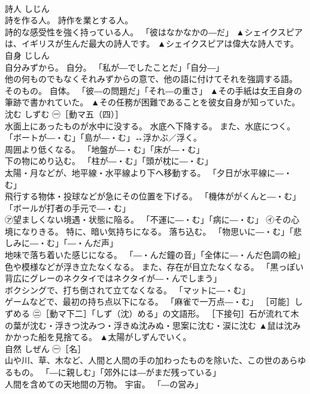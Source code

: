 \documentclass[8pt]{extreport}
\begin{document}
\begin{CJK}{UTF8}{min}
\\	詩人	しじん	
\\	詩を作る人。 詩作を業とする人。 
\\	詩的な感受性を強く持っている人。 「彼はなかなかの―だ」	▲シェイクスピアは、イギリスが生んだ最大の詩人です。 ▲シェイクスピアは偉大な詩人です。
\\	自身	じしん	
\\	自分みずから。 自分。 「私が―でしたことだ」「自分―」 
\\	他の何ものでもなくそれみずからの意で、他の語に付けてそれを強調する語。 そのもの。 自体。 「彼―の問題だ」「それ―の重さ」	▲その手紙は女王自身の筆跡で書かれていた。 ▲その任務が困難であることを彼女自身が知っていた。
\\	沈む	しずむ	㊀［動マ五（四）］ 
\\	水面上にあったものが水中に没する。 水底へ下降する。 また、水底につく。 「ボートが―・む」「島が―・む」↔浮かぶ／浮く。 
\\	周囲より低くなる。 「地盤が―・む」「床が―・む」 
\\	下の物にめり込む。 「柱が―・む」「頭が枕に―・む」 
\\	太陽・月などが、地平線・水平線より下へ移動する。 「夕日が水平線に―・む」 
\\	飛行する物体・投球などが急にその位置を下げる。 「機体ががくんと―・む」「ボールが打者の手元で―・む」 
\\	㋐望ましくない境遇・状態に陥る。 「不運に―・む」「病に―・む」 ㋑その心境になりきる。 特に、暗い気持ちになる。 落ち込む。 「物思いに―・む」「悲しみに―・む」「―・んだ声」 
\\	地味で落ち着いた感じになる。 「―・んだ鐘の音」「全体に―・んだ色調の絵」 
\\	色や模様などが浮き立たなくなる。 また、存在が目立たなくなる。 「黒っぽい背広にグレーのネクタイではネクタイが―・んでしまう」 
\\	ボクシングで、打ち倒されて立てなくなる。 「マットに―・む」 
\\	ゲームなどで、最初の持ち点以下になる。 「麻雀で一万点―・む」 ［可能］しずめる ㊁［動マ下二］「しず（沈）める」の文語形。 ［下接句］石が流れて木の葉が沈む・浮きつ沈みつ・浮きぬ沈みぬ・思案に沈む・涙に沈む	▲鼠は沈みかかった船を見捨てる。 ▲太陽がしずんでいく。
\\	自然	しぜん	㊀［名］ 
\\	山や川、草、木など、人間と人間の手の加わったものを除いた、この世のあらゆるもの。 「―に親しむ」「郊外には―がまだ残っている」 
\\	人間を含めての天地間の万物。 宇宙。 「―の営み」 

\end{CJK}
\end{document}
